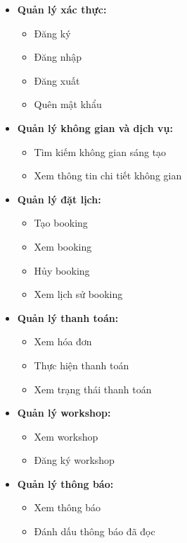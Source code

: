 \begin{itemize}
	\item \textbf{Quản lý xác thực:}
	\begin{itemize}
		\item Đăng ký
		\item Đăng nhập
		\item Đăng xuất
		\item Quên mật khẩu
	\end{itemize}
	
	\item \textbf{Quản lý không gian và dịch vụ:}
	\begin{itemize}
		\item Tìm kiếm không gian sáng tạo
		\item Xem thông tin chi tiết không gian
	\end{itemize}
	
	\item \textbf{Quản lý đặt lịch:}
	\begin{itemize}
		\item Tạo booking
		\item Xem booking
		\item Hủy booking
		\item Xem lịch sử booking
	\end{itemize}
	
	\item \textbf{Quản lý thanh toán:}
	\begin{itemize}
		\item Xem hóa đơn
		\item Thực hiện thanh toán
		\item Xem trạng thái thanh toán
	\end{itemize}
	
	\item \textbf{Quản lý workshop:}
	\begin{itemize}
		\item Xem workshop
		\item Đăng ký workshop
	\end{itemize}
	
	\item \textbf{Quản lý thông báo:}
	\begin{itemize}
		\item Xem thông báo
		\item Đánh dấu thông báo đã đọc
	\end{itemize}
	
\end{itemize}

